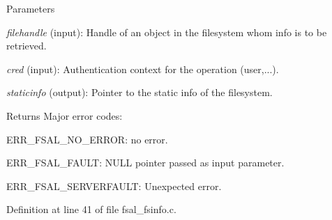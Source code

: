 \begin{DoxyParams}{Parameters}
\item[{\em filehandle}](input): Handle of an object in the filesystem whom info is to be retrieved. \item[{\em cred}](input): Authentication context for the operation (user,...). \item[{\em staticinfo}](output): Pointer to the static info of the filesystem.\end{DoxyParams}
\begin{DoxyReturn}{Returns}
Major error codes:
\begin{DoxyItemize}
\item ERR\_\-FSAL\_\-NO\_\-ERROR: no error.
\item ERR\_\-FSAL\_\-FAULT: NULL pointer passed as input parameter.
\item ERR\_\-FSAL\_\-SERVERFAULT: Unexpected error. 
\end{DoxyItemize}
\end{DoxyReturn}


Definition at line 41 of file fsal\_\-fsinfo.c.